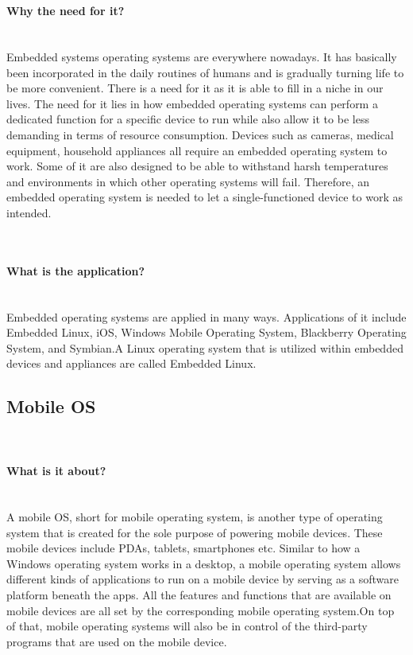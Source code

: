 \documentclass[conference]{IEEEtran}
\begin{document}
\\
\paragraph{Why the need for it?}\mbox{} \\
Embedded systems operating systems are everywhere nowadays. It has basically been incorporated in the daily routines of humans and is gradually turning life to be more convenient. There is a need for it as it is able to fill in a niche in our lives. The need for it lies in how embedded operating systems can perform a dedicated function for a specific device to run while also allow it to be less demanding in terms of resource consumption. Devices such as cameras, medical equipment, household appliances all require an embedded operating system to work. Some of it are also designed to be able to withstand harsh temperatures and environments in which other operating systems will fail. Therefore, an embedded operating system is needed to let a single-functioned device to work as intended.

\\
\paragraph{What is the application?}\mbox{} \\
Embedded operating systems are applied in many ways. Applications of it include Embedded Linux, iOS, Windows Mobile Operating System, Blackberry Operating System, and Symbian.A Linux operating system that is utilized within embedded devices and appliances are called Embedded Linux.

\subsection{Mobile OS}\\
\paragraph{What is it about?}\mbox{} \\
A mobile OS, short for mobile operating system, is another type of operating system that is created for the sole purpose of powering mobile devices. These mobile devices include PDAs, tablets, smartphones etc. Similar to how a Windows operating system works in a desktop, a mobile operating system allows different kinds of applications to run on a mobile device by serving as a software platform beneath the apps. All the features and functions that are available on mobile devices are all set by the corresponding mobile operating system.On top of that, mobile operating systems will also be in control of the third-party programs that are used on the mobile device.
\\
\end{document}
